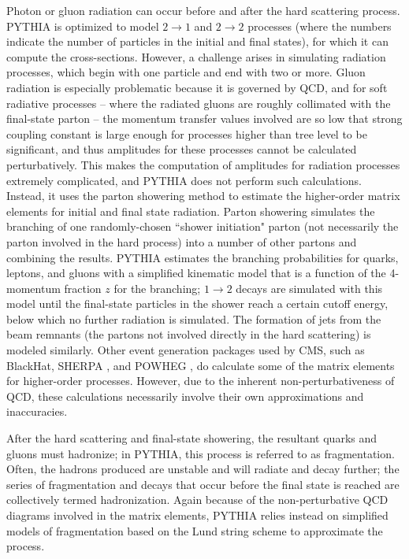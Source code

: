 Photon or gluon radiation can occur before and after the hard scattering process. PYTHIA is optimized to model $2 \rightarrow 1$ and $2 \rightarrow 2$ processes (where the numbers indicate the number of particles in the initial and final states), for which it can compute the cross-sections. However, a challenge arises in simulating radiation processes, which begin with one particle and end with two or more. Gluon radiation is especially problematic because it is governed by QCD, and for soft radiative processes -- where the radiated gluons are roughly collimated with the final-state parton -- the momentum transfer values involved are so low that strong coupling constant is large enough for processes higher than tree level to be significant, and thus amplitudes for these processes cannot be calculated perturbatively. This makes the computation of amplitudes for radiation processes extremely complicated, and PYTHIA does not perform such calculations. Instead, it uses the parton showering method to estimate the higher-order matrix elements for initial and final state radiation. Parton showering simulates the branching of one randomly-chosen ``shower initiation" parton (not necessarily the parton involved in the hard process) into a number of other partons and combining the results. PYTHIA estimates the branching probabilities for quarks, leptons, and gluons with a simplified kinematic model that is a function of the 4-momentum fraction $z$ for the branching; $1 \rightarrow 2$ decays are simulated with this model until the final-state particles in the shower reach a certain cutoff energy, below which no further radiation is simulated. The formation of jets from the beam remnants (the partons not involved directly in the hard scattering) is modeled similarly. Other event generation packages used by CMS, such as BlackHat, SHERPA \cite{Berger:1177972}, and POWHEG \cite{Alioli:2010ab}, do calculate some of the matrix elements for higher-order processes. However, due to the inherent non-perturbativeness of QCD, these calculations necessarily involve their own approximations and inaccuracies.

After the hard scattering and final-state showering, the resultant quarks and gluons must hadronize; in PYTHIA, this process is referred to as fragmentation. Often, the hadrons produced are unstable and will radiate and decay further; the series of fragmentation and decays that occur before the final state is reached are collectively termed hadronization. Again because of the non-perturbative QCD diagrams involved in the matrix elements, PYTHIA relies instead on simplified models of fragmentation based on the Lund string scheme to approximate the process.

